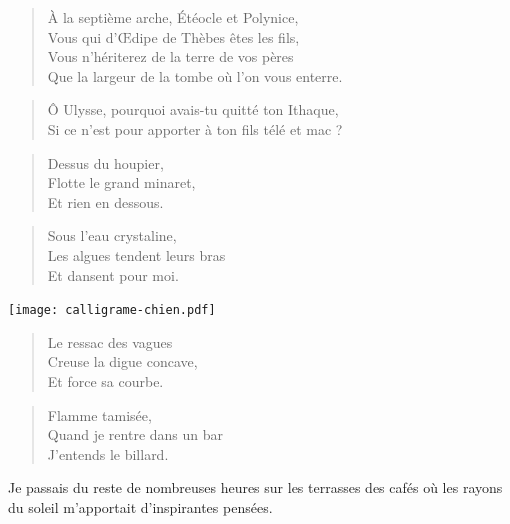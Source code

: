 \begin{verse}
À la septième arche, Étéocle et Polynice,\\
Vous qui d’Œdipe de Thèbes êtes les fils,\\
Vous n’hériterez de la terre de vos pères\\
Que la largeur de la tombe où l’on vous enterre.
\end{verse}

\begin{verse}
Ô Ulysse, pourquoi avais-tu quitté ton Ithaque,\\
Si ce n’est pour apporter à ton fils télé et mac ?
\end{verse}

\begin{verse}
Dessus du houpier,\\
Flotte le grand minaret,\\
Et rien en dessous.
\end{verse}

\begin{verse}
Sous l’eau crystaline,\\
Les algues tendent leurs bras\\
Et dansent pour moi.
\end{verse}

\begin{floatpoem}
\vspace{-1cm}
\texttt{[image: calligrame-chien.pdf]}
\end{floatpoem}

\begin{verse}
Le ressac des vagues\\
Creuse la digue concave,\\
Et force sa courbe.
\end{verse}

\begin{verse}
Flamme tamisée,\\
Quand je rentre dans un bar\\
J’entends le billard.
\end{verse}




\begin{prose}
Je passais du reste de nombreuses heures sur les terrasses des cafés où les rayons du soleil m’apportait d’inspirantes pensées.
\end{prose}

